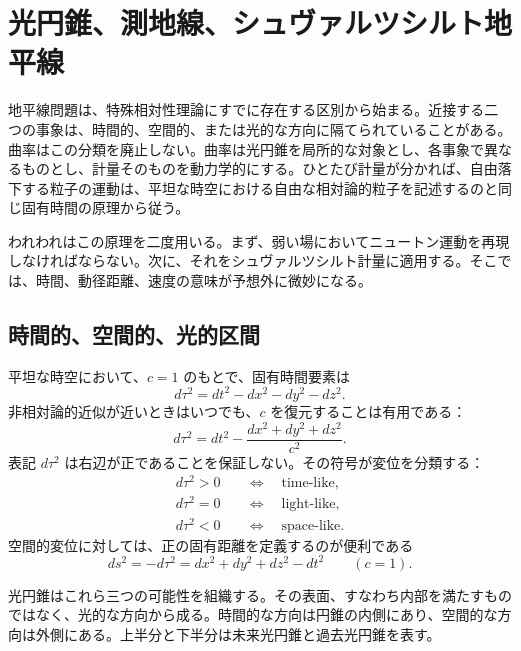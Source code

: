 \chapter{光円錐、測地線、シュヴァルツシルト地平線}

地平線問題は、特殊相対性理論にすでに存在する区別から始まる。近接する二つの事象は、時間的、空間的、または光的な方向に隔てられていることがある。曲率はこの分類を廃止しない。曲率は光円錐を局所的な対象とし、各事象で異なるものとし、計量そのものを動力学的にする。ひとたび計量が分かれば、自由落下する粒子の運動は、平坦な時空における自由な相対論的粒子を記述するのと同じ固有時間の原理から従う。

われわれはこの原理を二度用いる。まず、弱い場においてニュートン運動を再現しなければならない。次に、それをシュヴァルツシルト計量に適用する。そこでは、時間、動径距離、速度の意味が予想外に微妙になる。

\section{時間的、空間的、光的区間}

平坦な時空において、\(c=1\) のもとで、固有時間要素は
\begin{equation}
d\tau^2=dt^2-dx^2-dy^2-dz^2.
\label{eq:l5-minkowski-proper-time}
\end{equation}
非相対論的近似が近いときはいつでも、\(c\) を復元することは有用である：
\begin{equation}
d\tau^2
=dt^2-\frac{dx^2+dy^2+dz^2}{c^2}.
\label{eq:l5-minkowski-c}
\end{equation}
表記 \(d\tau^2\) は右辺が正であることを保証しない。その符号が変位を分類する：
\begin{align}
d\tau^2>0
&\quad\Longleftrightarrow\quad \text{time-like},\\
d\tau^2=0
&\quad\Longleftrightarrow\quad \text{light-like},\\
d\tau^2<0
&\quad\Longleftrightarrow\quad \text{space-like}.
\end{align}
空間的変位に対しては、正の固有距離を定義するのが便利である
\begin{equation}
ds^2=-d\tau^2
=dx^2+dy^2+dz^2-dt^2
\qquad(c=1).
\label{eq:l5-proper-distance}
\end{equation}

光円錐はこれら三つの可能性を組織する。その表面、すなわち内部を満たすものではなく、光的な方向から成る。時間的な方向は円錐の内側にあり、空間的な方向は外側にある。上半分と下半分は未来光円錐と過去光円錐を表す。

